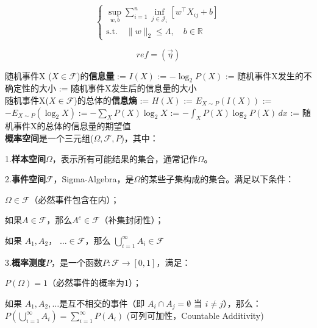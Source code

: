 \documentclass{main}
\begin{document}
\begin{equation}
\begin{cases}
    \sup\limits_{w,b} \sum\limits_{i=1}^n \inf\limits_{j \in \mathcal{J}_i} \left[ w^\top X_{ij} + b \right] \\
    \text{s.t.} \quad \|w\|_2 \leq \Lambda, \quad b \in \mathbb{R}
\end{cases}    
\end{equation} 



\begin{equation}
    ref=(\vec{\eta}) 
\end{equation} 



随机事件X ($X \in \mathcal{F}$)的\textbf{信息量} := $I(X)$ := $-\log_{2}{P(X)}$ := 随机事件X发生的不确定性的大小 := 随机事件X发生后的信息量的大小 \\



随机事件X($X \in \mathcal{F}$)的总体的\textbf{信息熵} := $H(X)$ := $E_{X \sim P}(I(X))$ := $-E_{X \sim P}(\log_{2}X) := -\sum_{X}P(X)\log_{2}X $ := $-\int_{X}P(X)\log_{2}P(X)\,dx$ := 随机事件X的总体的信息量的期望值 \\



\textbf{概率空间}是一个三元组($\Omega, \mathcal{F}, P$)，其中：

1.\textbf{样本空间}$\Omega$，表示所有可能结果的集合，通常记作$\Omega$。

2.\textbf{事件空间}$\mathcal{F}$，Sigma-Algebra，是$\Omega$的某些子集构成的集合。满足以下条件：

 $\Omega \in \mathcal{F}$（必然事件包含在内）；

 如果$A \in \mathcal{F}$，那么$A^{c} \in \mathcal{F}$（补集封闭性）；

如果 $A_{1}, A_{2}$， $\dots \in \mathcal{F}$，那么 $\bigcup_{i=1}^{\infty} A_{i} \in \mathcal{F}$

3.\textbf{概率测度}$P$，是一个函数$ P: \mathcal{F} \to [0,1]$，满足：

 $P(\Omega) = 1$（必然事件的概率为1）；

 如果 $A_{1}, A_{2}, \dots$是互不相交的事件（即 $A_{i} \cap A_{j} = \emptyset$ 当 $i \neq j $），那么：$P\left(\bigcup_{i=1}^{\infty} A_{i}\right) = \sum_{i=1}^{\infty} P\left(A_{i}\right)$ (可列可加性，Countable Additivity)
\end{document}
